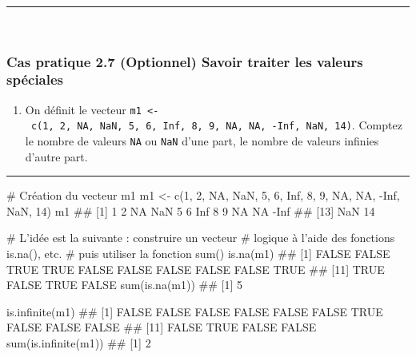 \documentclass[12pt,twosided, notitlepage]{book}
\newenvironment{Shaded}{}{}
\newcommand{\KeywordTok}[1]{\textcolor[rgb]{0.00,0.00,1.00}{{#1}}}
\newcommand{\DecValTok}[1]{{#1}}
\newcommand{\StringTok}[1]{\textcolor[rgb]{0.00,0.50,0.50}{{#1}}}
\newcommand{\CommentTok}[1]{\textcolor[rgb]{0.00,0.50,0.00}{{#1}}}
\newcommand{\OtherTok}[1]{\textcolor[rgb]{1.00,0.25,0.00}{{#1}}}
\newcommand{\NormalTok}[1]{{#1}}
\providecommand{\tightlist}{%
  \setlength{\itemsep}{0pt}\setlength{\parskip}{0pt}}
\newif \ifsol
\renewenvironment{Shaded}{\begin{snugshade}}{\end{snugshade}}
\begin{document}
\begin{center}\rule{0.5\linewidth}{\linethickness}\end{center}

~

\subsubsection{\texorpdfstring{\textbf{Cas pratique 2.7} (Optionnel)
Savoir traiter les valeurs
spéciales}{Cas pratique 2.7 (Optionnel) Savoir traiter les valeurs spéciales}}\label{cas-pratique-2.7-optionnel-savoir-traiter-les-valeurs-speciales}


\begin{enumerate}
\def\labelenumi{\alph{enumi}.}
\tightlist
\item
  On définit le vecteur
  \texttt{m1\ \textless{}-\ c(1,\ 2,\ NA,\ NaN,\ 5,\ 6,\ Inf,\ 8,\ 9,\ NA,\ NA,\ -Inf,\ NaN,\ 14)}.
  Comptez le nombre de valeurs \texttt{NA} ou \texttt{NaN} d'une part,
  le nombre de valeurs infinies d'autre part.
\end{enumerate}

\ifsol 

\begin{center} \rule{0.5\linewidth}{\linethickness}\end{center}

\begin{Shaded}
\begin{Highlighting}[]
\CommentTok{# Création du vecteur m1}
\NormalTok{m1 <-}\StringTok{ }\KeywordTok{c}\NormalTok{(}\DecValTok{1}\NormalTok{, }\DecValTok{2}\NormalTok{, }\OtherTok{NA}\NormalTok{, }\OtherTok{NaN}\NormalTok{, }\DecValTok{5}\NormalTok{, }\DecValTok{6}\NormalTok{, }\OtherTok{Inf}\NormalTok{, }\DecValTok{8}\NormalTok{, }\DecValTok{9}\NormalTok{, }\OtherTok{NA}\NormalTok{, }\OtherTok{NA}\NormalTok{, -}\OtherTok{Inf}\NormalTok{, }\OtherTok{NaN}\NormalTok{, }\DecValTok{14}\NormalTok{)}
\NormalTok{m1}
  \NormalTok{##  [1]    1    2   NA  NaN    5    6  Inf    8    9   NA   NA -Inf}
  \NormalTok{## [13]  NaN   14}

\CommentTok{# L'idée est la suivante : construire un vecteur}
\CommentTok{# logique à l'aide des fonctions is.na(), etc.}
\CommentTok{# puis utiliser la fonction sum()}
\KeywordTok{is.na}\NormalTok{(m1)}
  \NormalTok{##  [1] FALSE FALSE  TRUE  TRUE FALSE FALSE FALSE FALSE FALSE  TRUE}
  \NormalTok{## [11]  TRUE FALSE  TRUE FALSE}
\KeywordTok{sum}\NormalTok{(}\KeywordTok{is.na}\NormalTok{(m1))}
  \NormalTok{## [1] 5}

\KeywordTok{is.infinite}\NormalTok{(m1)}
  \NormalTok{##  [1] FALSE FALSE FALSE FALSE FALSE FALSE  TRUE FALSE FALSE FALSE}
  \NormalTok{## [11] FALSE  TRUE FALSE FALSE}
\KeywordTok{sum}\NormalTok{(}\KeywordTok{is.infinite}\NormalTok{(m1))}
  \NormalTok{## [1] 2}
\end{Highlighting}
\end{Shaded}
\end{document}
